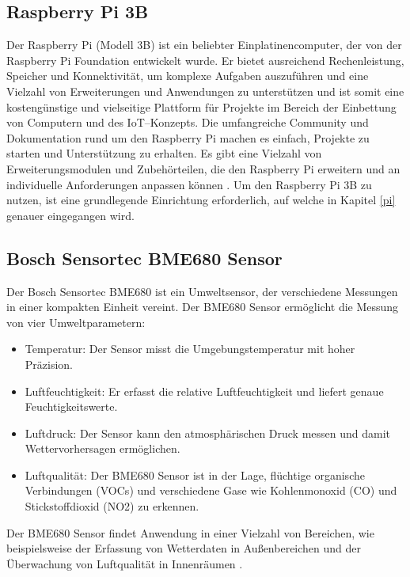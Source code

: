 \documentclass[conference]{IEEEtran}
\begin{document}
\subsection{Raspberry Pi 3B}
Der Raspberry Pi (Modell 3B) ist ein beliebter Einplatinencomputer, der von der Raspberry Pi Foundation entwickelt wurde. Er bietet ausreichend Rechenleistung, Speicher und Konnektivität, um komplexe Aufgaben auszuführen und eine Vielzahl von Erweiterungen und Anwendungen zu unterstützen und ist somit eine kostengünstige und vielseitige Plattform für Projekte im Bereich der Einbettung von Computern und des IoT--Konzepts. Die umfangreiche Community und Dokumentation rund um den Raspberry Pi machen es einfach, Projekte zu starten und Unterstützung zu erhalten. Es gibt eine Vielzahl von Erweiterungsmodulen und Zubehörteilen, die den Raspberry Pi erweitern und an individuelle Anforderungen anpassen können \cite{raspy}. Um den Raspberry Pi 3B zu nutzen, ist eine grundlegende Einrichtung erforderlich, auf welche in Kapitel \ref{pi} genauer eingegangen wird.

\subsection{Bosch Sensortec BME680 Sensor}
Der Bosch Sensortec BME680 ist ein Umweltsensor, der verschiedene Messungen in einer kompakten Einheit vereint. Der BME680 Sensor ermöglicht die Messung von vier Umweltparametern:
\begin{itemize}
	\item Temperatur: Der Sensor misst die Umgebungstemperatur mit hoher Präzision.
	\item Luftfeuchtigkeit: Er erfasst die relative Luftfeuchtigkeit und liefert genaue Feuchtigkeitswerte.
	\item Luftdruck: Der Sensor kann den atmosphärischen Druck messen und damit Wettervorhersagen ermöglichen.
	\item Luftqualität: Der BME680 Sensor ist in der Lage, flüchtige organische Verbindungen (VOCs) und verschiedene Gase wie Kohlenmonoxid (CO) und Stickstoffdioxid (NO2) zu erkennen.
\end{itemize}
Der BME680 Sensor findet Anwendung in einer Vielzahl von Bereichen, wie beispielsweise der Erfassung von Wetterdaten in Außenbereichen und der Überwachung von Luftqualität in Innenräumen \cite{bme} \cite{bmeDataSheet}. 
\end{document}
